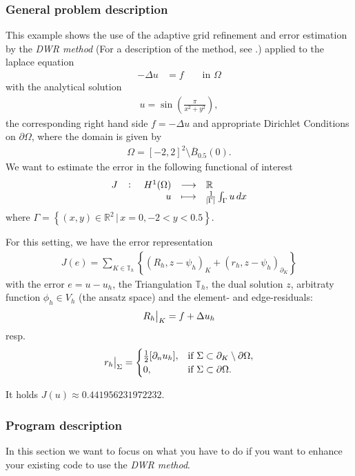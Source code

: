 \subsubsection{General problem description}
This example shows the use of the adaptive grid refinement and error estimation by the \textit{DWR method} (For a description of the method, see \cite{BR03}.) applied to the laplace equation 
\begin{align*}
-\Delta u &= f && \text{ in } \Omega
\end{align*}
with the analytical solution
\begin{align*}
u = \sin\left(\frac{\pi}{x^2 + y^2}\right),
\end{align*}
 the corresponding right hand side $f = -\Delta u$ and appropriate Dirichlet Conditions on $\partial \Omega$, where the domain is given by
\begin{align*}
\Omega = [-2,2]^2\setminus \overline{B}_{0.5}(0).
\end{align*}
We want to estimate the error in the following functional of interest
$$\fullfunction{J}{H^1(\Omega)}{\mathbb{R}}{u}{\frac 1 {\abs{\Gamma}} \int_\Gamma u \,dx}$$
where
$\Gamma = \left\{(x,y)\in \mathbb R ^2\,\big | \,x=0,-2<y<0.5 \right \}$.

For this setting, we have the error representation
\begin{align}\label{dwr.error_identity}
J(e)=\sum_{K\in \mathbb T _h} \left\{(R_h, z-\psi_h)_K + (r_h, z-\psi_h)_{\partial_K}\right\}
\end{align}
with the error $e=u-u_h$, the Triangulation $\mathbb T_h$, the dual solution $z$, arbitraty function $\phi_h \in V_h$ (the ansatz space) and the element- and edge-residuals: 
\begin{align}\label{dwr.element_residual}
\eval[1]{R_h}_{K} = f+\Delta u_h
\end{align}
resp. 
\begin{align}\label{dwr.edge_residual}
\eval[1]{r_h}_{\Sigma} =
\begin{cases}
\frac 12 [\partial_n u_h] ,&\text{if } \Sigma \subset \partial_K \setminus \partial \Omega,\\
0,& \text{if } \Sigma \subset\partial \Omega.
\end{cases}
\end{align}

It holds $J(u) \approx 0.441956231972232$.
\subsubsection{Program description}
In this section we want to focus on what you have to do if you want to enhance your existing code to use the \textit{DWR method}.


